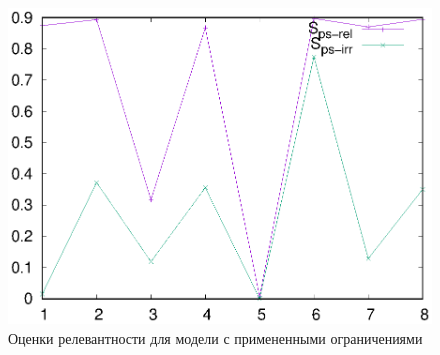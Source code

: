 \begin{figure}
    \centerline{\includegraphics[scale=0.8]{313-2_scores.eps}}
    \caption{Оценки релевантности для модели с примененными ограничениями}\label{fig:wv-scores-2}
\end{figure}